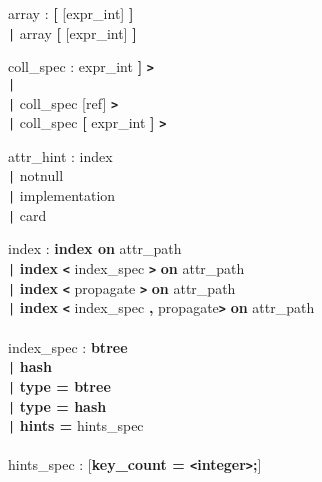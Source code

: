 \begin{tabbing}
\grindent
array \> : {\bf [} [expr\_int] {\bf ]}\\
\> \texttt{|} array {\bf [} [expr\_int] {\bf ]}
\end{tabbing}

\begin{tabbing}
\grindent
coll\_spec \> : \ident {\bf \texttt{<}} \ident {\bf [} expr\_int {\bf ]} {\bf \texttt{>}}\\
\> \texttt{|} \ident {\bf \texttt{<}} \ident [ref] {\bf \texttt{>}}\\
\> \texttt{|} \ident {\bf \texttt{<}} coll\_spec [ref] {\bf \texttt{>}}\\
\> \texttt{|} \ident {\bf \texttt{<}} coll\_spec {\bf [} expr\_int {\bf ]} {\bf \texttt{>}}
\end{tabbing}

\begin{tabbing}
\grindent
attr\_hint \> : index\\
\> \texttt{|} notnull\\
\> \texttt{|} implementation\\
\> \texttt{|} card
\end{tabbing}

\begin{tabbing}
\grindent
index \> : {\bf index on} attr\_path\\
\> \texttt{|} {\bf index} {\bf \texttt{<}} index\_spec {\bf \texttt{>}} {\bf on} attr\_path\\
\> \texttt{|} {\bf index} {\bf \texttt{<}} propagate {\bf \texttt{>}} {\bf on} attr\_path\\
\> \texttt{|} {\bf index} {\bf \texttt{<}} index\_spec {\bf ,} propagate{\bf \texttt{>}} {\bf on} attr\_path\\
\\
index\_spec \> : {\bf btree} \\
\> \texttt{|} {\bf hash}\\
\> \texttt{|} {\bf type = btree}\\
\> \texttt{|} {\bf type = hash}\\
\> \texttt{|} {\bf hints =} hints\_spec\\
\\
hints\_spec \> : [{\bf key\_count = \texttt{<}integer\texttt{>};}]\\
\>[{\bf initial\_size = \texttt{<}integer\texttt{>};}]\\
\>[{\bf initial\_object\_count = \texttt{<}integer\texttt{>};}]\\
\>[{\bf extend\_coef = \texttt{<}integer\texttt{>};}]\\
\>[{\bf size\_max = \texttt{<}integer\texttt{>};}]\\
\>[{\bf key\_function = \texttt{<}class\texttt{>}::\texttt{<}method\texttt{>};}]\\
\>[{\bf dataspace = }\ident{\bf ;}]
\end{tabbing}

